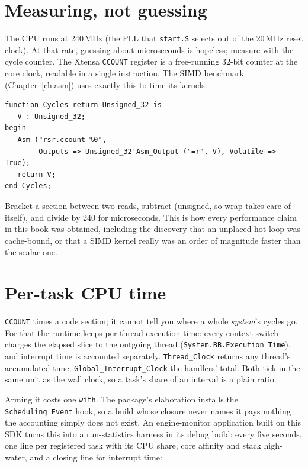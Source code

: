 \section{Measuring, not guessing}

The CPU runs at 240\,MHz (the PLL that \texttt{start.S} selects out of the 20\,MHz
reset clock). At that rate, guessing about microseconds is hopeless; measure with the
cycle counter. The Xtensa \texttt{CCOUNT} register is a free-running 32-bit counter
at the core clock, readable in a single instruction. The SIMD benchmark
(Chapter~\ref{ch:asm}) uses exactly this to time its kernels:

\begin{lstlisting}
function Cycles return Unsigned_32 is
   V : Unsigned_32;
begin
   Asm ("rsr.ccount %0",
        Outputs => Unsigned_32'Asm_Output ("=r", V), Volatile => True);
   return V;
end Cycles;
\end{lstlisting}

Bracket a section between two reads, subtract (unsigned, so wrap takes care of
itself), and divide by 240 for microseconds. This is how every performance claim in
this book was obtained, including the discovery that an unplaced hot loop was
cache-bound, or that a SIMD kernel really was an order of magnitude faster than the
scalar one.

\section{Per-task CPU time}

\texttt{CCOUNT} times a code section; it cannot tell you where a whole
\emph{system}'s cycles go.  For that the runtime keeps per-thread execution
time: every context switch charges the elapsed slice to the outgoing thread
(\texttt{System.BB.Execution\_Time}), and interrupt time is accounted
separately.  \texttt{Thread\_Clock} returns any thread's accumulated time;
\texttt{Global\_Interrupt\_Clock} the handlers' total.  Both tick in the same
unit as the wall clock, so a task's share of an interval is a plain ratio.

Arming it costs one \texttt{with}.  The package's elaboration installs the
\texttt{Scheduling\_Event} hook, so a build whose closure never names it pays
nothing \textemdash{} the accounting simply does not exist.  An engine-monitor
application built on this SDK turns this into a run-statistics harness in its
debug build: every five seconds, one line per registered task
with its CPU share, core affinity and stack high-water, and a closing line for
interrupt time:

